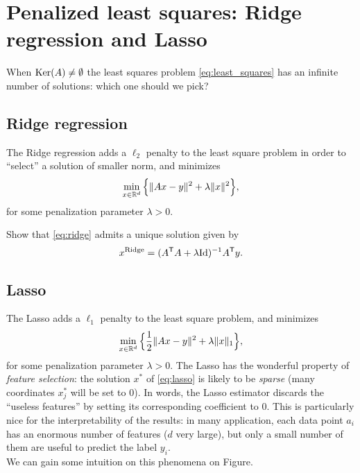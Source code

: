 \documentclass[11pt,nocut]{article}
\begin{document}
\section{Penalized least squares: Ridge regression and Lasso}

When ${{\rm Ker}}(A) \neq \emptyset$ the least squares problem \eqref{eq:least_squares} has an infinite number of solutions: which one should we pick?

\subsection{Ridge regression}

The Ridge regression adds a $\ell_2$ penalty to the least square problem in order to ``select'' a solution of smaller norm, and minimizes
\begin{equation}\label{eq:ridge}
	\min_{x \in \mathbb{R}^d} \Big\{ \| Ax - y \|^2 + \lambda \|x\|^2 \Big\},
\end{equation}
for some penalization parameter $\lambda >0$.
\begin{exercise}
	Show that \eqref{eq:ridge} admits a unique solution given by
	$$
	x^{\rm Ridge} = (A^{{\sf T}} A + \lambda {{\rm Id}})^{-1} A^{{\sf T}} y.
	$$
\end{exercise}

\subsection{Lasso}

The Lasso adds a $\ell_1$ penalty to the least square problem, and minimizes
\begin{equation}\label{eq:lasso}
	\min_{x \in \mathbb{R}^d} \Big\{ \frac{1}{2} \| Ax - y \|^2 + \lambda \|x\|_1 \Big\},
\end{equation}
for some penalization parameter $\lambda >0$.
The Lasso has the wonderful property of \emph{feature selection}: the solution $x^*$ of \eqref{eq:lasso} is likely to be \emph{sparse} (many coordinates $x^*_j$ will be set to $0$).
In words, the Lasso estimator discards the ``useless features'' by setting its corresponding coefficient to $0$. 
This is particularly nice for the interpretability of the results: in many application, each data point $a_i$ has an enormous number of features ($d$ very large), but only a small number of them are useful to predict the label $y_i$.
\\

We can gain some intuition on this phenomena on Figure.
\end{document}

